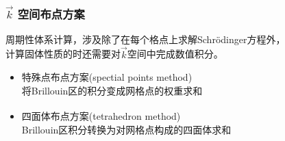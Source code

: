 \documentclass[cjk,slidestop,compress,mathserif,blue]{beamer}
\newcommand{\upcite}[1]{\hspace{0ex}\textsuperscript{\cite{#1}}} %
\begin{document}
\frame
{
\frametitle{$\vec k$ 空间布点方案}
\vskip 10pt
周期性体系计算，涉及除了在每个格点上求解\textrm{Schr\"odinger}方程外，\\计算固体性质的时还需要对$\vec k$空间中完成数值积分。
\vskip 5pt
\begin{itemize}%
    \item 特殊点布点方案\textrm{(spectial points method)}\\
      将\textrm{Brillouin}区的积分变成网格点的权重求和
    \item 四面体布点方案\textrm{(tetrahedron method)}\upcite{PRB49-16233_1994}\\
	    \textrm{Brillouin}区积分转换为对网格点构成的四面体求和
\end{itemize}
\begin{figure}[h!]
\centering
\vspace*{-0.2in}
\label{Specila_Tetrahedron}
\end{figure}
}
\end{document}
